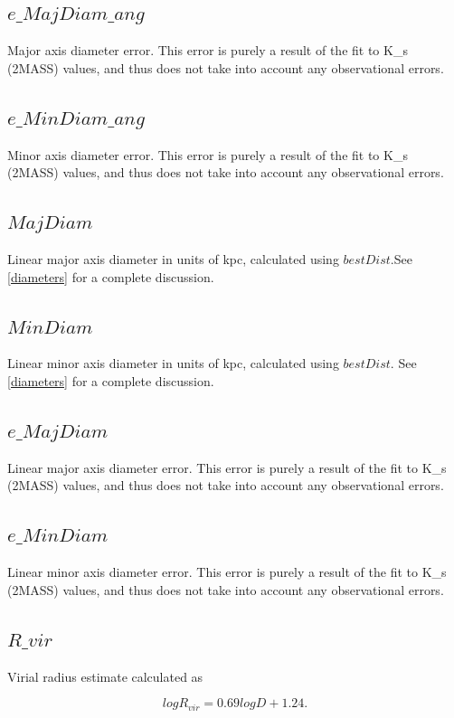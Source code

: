 \documentclass[iop]{emulateapj-rtx4}
\begin{document}
\subsection{$e\_MajDiam\_ang$}
Major axis diameter error. This error is purely a result of the fit to K\_s (2MASS) values, and thus does not take into account any observational errors.

\subsection{$e\_MinDiam\_ang$}
Minor axis diameter error. This error is purely a result of the fit to K\_s (2MASS) values, and thus does not take into account any observational errors.

\subsection{$MajDiam$}
Linear major axis diameter in units of kpc, calculated using $bestDist$.See \ref{diameters} for a complete discussion.

\subsection{$MinDiam$}
Linear minor axis diameter in units of kpc, calculated using $bestDist$. See \ref{diameters} for a complete discussion.

\subsection{$e\_MajDiam$}
Linear major axis diameter error. This error is purely a result of the fit to K\_s (2MASS) values, and thus does not take into account any observational errors.

\subsection{$e\_MinDiam$}
Linear minor axis diameter error. This error is purely a result of the fit to K\_s (2MASS) values, and thus does not take into account any observational errors.

\subsection{$R\_vir$}
Virial radius estimate calculated as

\begin{equation}
log R_{vir} = 0.69 log D + 1.24.
\end{equation}
\end{document}
